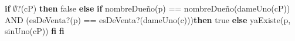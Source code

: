 \documentclass[10pt, a4paper]{article}
\newcommand{\tab}{\hspace*{5mm}}
\begin{document}
\begin{tad}{}
{}

{\addtolength{\leftskip}{20 mm}
\noindent \textbf{if} $\emptyset$?(cP) \textbf{then} \newline
\tab false \newline
\noindent \textbf{else} \newline
 \tab \textbf{if} nombreDue\~no(p) ==   nombreDue\~no(dameUno(cP)) AND (esDeVenta?(p) == esDeVenta?(dameUno(c)))\textbf{then}  \newline
\tab \tab true  \newline
\tab \textbf{else} \newline
\tab \tab  yaExiste(p, sinUno(cP)) \newline
\tab \textbf{fi} \newline 
\noindent \textbf{fi}

}

\end{tad}
\end{document}
